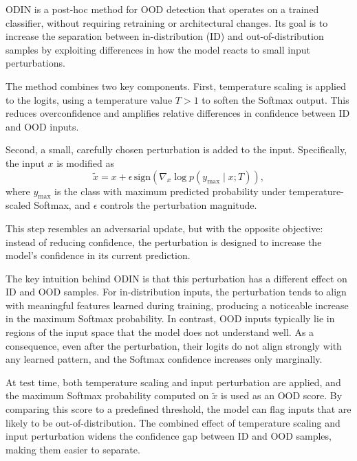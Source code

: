ODIN is a post-hoc method for OOD detection that operates on a trained classifier, without requiring retraining or architectural changes. Its goal is to increase the separation between in-distribution (ID) and out-of-distribution samples by exploiting differences in how the model reacts to small input perturbations.

The method combines two key components. First, temperature scaling is applied to the logits, using a temperature value $T > 1$ to soften the Softmax output. This reduces overconfidence and amplifies relative differences in confidence between ID and OOD inputs.

Second, a small, carefully chosen perturbation is added to the input. Specifically, the input $x$ is modified as
\[
\tilde{x} = x + \epsilon \, \mathrm{sign} \left( \nabla_x \log p(y_{\max} \mid x; T) \right),
\]
where $y_{\max}$ is the class with maximum predicted probability under temperature-scaled Softmax, and $\epsilon$ controls the perturbation magnitude.

This step resembles an adversarial update, but with the opposite objective: instead of reducing confidence, the perturbation is designed to increase the model’s confidence in its current prediction.

The key intuition behind ODIN is that this perturbation has a different effect on ID and OOD samples. For in-distribution inputs, the perturbation tends to align with meaningful features learned during training, producing a noticeable increase in the maximum Softmax probability. In contrast, OOD inputs typically lie in regions of the input space that the model does not understand well. As a consequence, even after the perturbation, their logits do not align strongly with any learned pattern, and the Softmax confidence increases only marginally.

At test time, both temperature scaling and input perturbation are applied, and the maximum Softmax probability computed on $\tilde{x}$ is used as an OOD score. By comparing this score to a predefined threshold, the model can flag inputs that are likely to be out-of-distribution. The combined effect of temperature scaling and input perturbation widens the confidence gap between ID and OOD samples, making them easier to separate.
